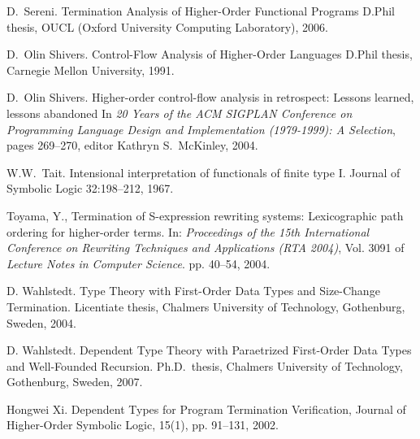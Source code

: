 \documentclass{LMCS}
\theoremstyle{definition}\newtheorem{env}[thm]{Environment}
\begin{document}
\begin{thebibliography}{MMM}
D.\  Sereni.
\newblock Termination Analysis of Higher-Order Functional Programs
\newblock D.Phil thesis, OUCL (Oxford University Computing 
Laboratory),  2006.




D.\  Olin Shivers.
\newblock Control-Flow Analysis of Higher-Order Languages
\newblock D.Phil thesis, Carnegie Mellon University, 1991.

D.\  Olin Shivers.
\newblock Higher-order control-flow analysis in retrospect:
    Lessons learned, lessons abandoned
\newblock In \emph{20 Years of the ACM SIGPLAN Conference on 
         Programming Language Design and Implementation (1979-1999): 
         A Selection}, 
    pages 269--270,
    editor Kathryn S.~McKinley, 2004.

W.W.\ Tait.
Intensional interpretation of functionals of finite type I. 
{Journal of Symbolic Logic 32:198--212}, 1967.


Toyama, Y.,
Termination of S-expression rewriting systems: Lexicographic
  path ordering for higher-order terms.
\newblock In: {\em Proceedings of the 15th International Conference on
  Rewriting Techniques and Applications (RTA 2004)}, Vol. 3091 of {\em Lecture
  Notes in Computer Science}. pp. 40--54, 2004.



D. Wahlstedt.
Type Theory with First-Order Data Types and Size-Change Termination.
\newblock Licentiate thesis, Chalmers University of Technology, Gothenburg, Sweden, 2004.

D. Wahlstedt.
Dependent Type Theory with Paraetrized First-Order Data Types and Well-Founded Recursion.
\newblock Ph.D.\ thesis, Chalmers University of Technology, Gothenburg, Sweden, 2007.


Hongwei Xi.
 Dependent Types for Program Termination Verification, 
 Journal of Higher-Order Symbolic Logic, 15(1), pp. 91--131, 2002.

\end{thebibliography}
\end{document}
